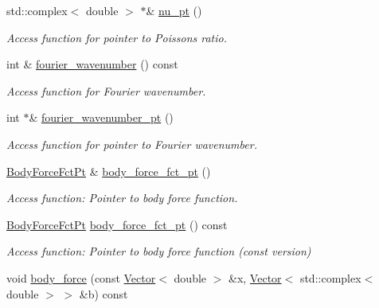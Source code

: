 \begin{DoxyCompactItemize}
std\+::complex$<$ double $>$ $\ast$\& \hyperlink{classoomph_1_1TimeHarmonicFourierDecomposedLinearElasticityEquationsBase_a8a1c39c0524f7497dd1f2b17f64d6bf2}{nu\+\_\+pt} ()
\begin{DoxyCompactList}\small\item\em Access function for pointer to Poisson\textquotesingle{}s ratio. \end{DoxyCompactList}\item 
int \& \hyperlink{classoomph_1_1TimeHarmonicFourierDecomposedLinearElasticityEquationsBase_a51a6f8b0d27880252518256dbe60bc49}{fourier\+\_\+wavenumber} () const
\begin{DoxyCompactList}\small\item\em Access function for Fourier wavenumber. \end{DoxyCompactList}\item 
int $\ast$\& \hyperlink{classoomph_1_1TimeHarmonicFourierDecomposedLinearElasticityEquationsBase_aef8b8fd381c219d23dc52eb219f4f643}{fourier\+\_\+wavenumber\+\_\+pt} ()
\begin{DoxyCompactList}\small\item\em Access function for pointer to Fourier wavenumber. \end{DoxyCompactList}\item 
\hyperlink{classoomph_1_1TimeHarmonicFourierDecomposedLinearElasticityEquationsBase_ac582edc989cd98af8a03f5bf58d7a05a}{Body\+Force\+Fct\+Pt} \& \hyperlink{classoomph_1_1TimeHarmonicFourierDecomposedLinearElasticityEquationsBase_a324fb3895931d4bb35ea56ebc202c856}{body\+\_\+force\+\_\+fct\+\_\+pt} ()
\begin{DoxyCompactList}\small\item\em Access function\+: Pointer to body force function. \end{DoxyCompactList}\item 
\hyperlink{classoomph_1_1TimeHarmonicFourierDecomposedLinearElasticityEquationsBase_ac582edc989cd98af8a03f5bf58d7a05a}{Body\+Force\+Fct\+Pt} \hyperlink{classoomph_1_1TimeHarmonicFourierDecomposedLinearElasticityEquationsBase_aedfbce28438549e162312546f8c31485}{body\+\_\+force\+\_\+fct\+\_\+pt} () const
\begin{DoxyCompactList}\small\item\em Access function\+: Pointer to body force function (const version) \end{DoxyCompactList}\item 
void \hyperlink{classoomph_1_1TimeHarmonicFourierDecomposedLinearElasticityEquationsBase_a7e28782573e1210b9a5f98f17360f6e9}{body\+\_\+force} (const \hyperlink{classoomph_1_1Vector}{Vector}$<$ double $>$ \&x, \hyperlink{classoomph_1_1Vector}{Vector}$<$ std\+::complex$<$ double $>$ $>$ \&b) const

\end{DoxyCompactItemize}

